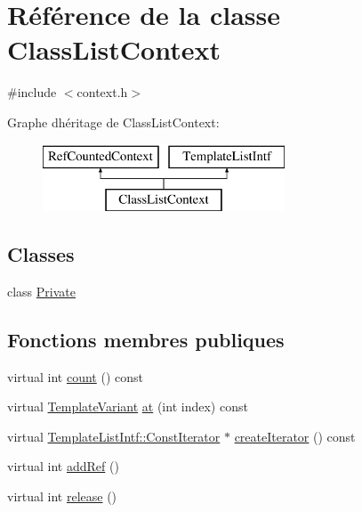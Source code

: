 \hypertarget{class_class_list_context}{}\section{Référence de la classe Class\+List\+Context}
\label{class_class_list_context}


{\ttfamily \#include $<$context.\+h$>$}

Graphe d\textquotesingle{}héritage de Class\+List\+Context\+:\begin{figure}[H]
\begin{center}
\leavevmode
\includegraphics[height=2.000000cm]{class_class_list_context}
\end{center}
\end{figure}
\subsection*{Classes}
\begin{DoxyCompactItemize}
\item 
class \hyperlink{class_class_list_context_1_1_private}{Private}
\end{DoxyCompactItemize}
\subsection*{Fonctions membres publiques}
\begin{DoxyCompactItemize}
\item 
virtual int \hyperlink{class_class_list_context_a2698c6e99f8161226a4fc2440d286834}{count} () const 
\item 
virtual \hyperlink{class_template_variant}{Template\+Variant} \hyperlink{class_class_list_context_a57f4a741c8ebba4407b108dd893ebc17}{at} (int index) const 
\item 
virtual \hyperlink{class_template_list_intf_1_1_const_iterator}{Template\+List\+Intf\+::\+Const\+Iterator} $\ast$ \hyperlink{class_class_list_context_a0cfb19472dcfe9b9c65c65df4f96fc5e}{create\+Iterator} () const 
\item 
virtual int \hyperlink{class_class_list_context_a0eff9811a77d47277e1386394c374151}{add\+Ref} ()
\item 
virtual int \hyperlink{class_class_list_context_a4e60c2feddfa7d51bdebf0e412266b91}{release} ()
\end{DoxyCompactItemize}
